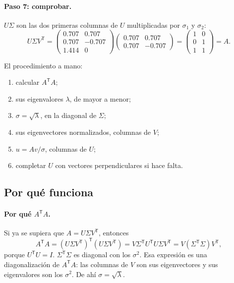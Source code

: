 \documentclass[11pt,letterpaper]{article}
\newcommand{\T}{^{\mathsf{T}}}
\newcommand{\raiz}[1]{\sqrt{#1}}
\begin{document}
\paragraph{Paso 7: comprobar.} $U\Sigma$ son las dos primeras columnas
de $U$ multiplicadas por $\sigma_1$ y $\sigma_2$:
\[
    U \Sigma V\T =
    \begin{pmatrix} 0.707 & 0.707 \\ 0.707 & -0.707 \\ 1.414 & 0
    \end{pmatrix}
    \begin{pmatrix} 0.707 & 0.707 \\ 0.707 & -0.707 \end{pmatrix}
    =
    \begin{pmatrix} 1 & 0 \\ 0 & 1 \\ 1 & 1 \end{pmatrix} = A .
\]

\begin{resultado}
    El procedimiento a mano:
    \begin{enumerate}[itemsep=0.1em]
        \item calcular $A\T A$;
        \item sus eigenvalores $\lambda$, de mayor a menor;
        \item $\sigma = \raiz{\lambda}$, en la diagonal de $\Sigma$;
        \item sus eigenvectores normalizados, columnas de $V$;
        \item $u = A v / \sigma$, columnas de $U$;
        \item completar $U$ con vectores perpendiculares si hace falta.
    \end{enumerate}
\end{resultado}

\subsection*{Por qué funciona}

\paragraph{Por qué $A\T A$.} Si ya se supiera que $A = U \Sigma V\T$,
entonces
\[
    A\T A = (U \Sigma V\T)\T (U \Sigma V\T)
          = V \Sigma\T U\T U \Sigma V\T
          = V (\Sigma\T \Sigma) V\T ,
\]
porque $U\T U = I$. $\Sigma\T \Sigma$ es diagonal con los $\sigma^2$.
Esa expresión es una diagonalización de $A\T A$: las columnas de $V$
son sus eigenvectores y sus eigenvalores son los $\sigma^2$. De ahí
$\sigma = \raiz{\lambda}$.
\end{document}
